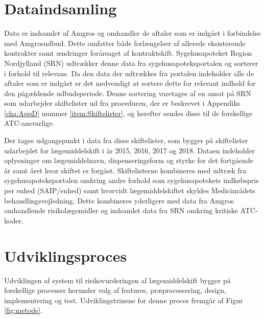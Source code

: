 \section{Dataindsamling}
Data er indsamlet af Amgros og omhandler de aftaler som er indgået i forbindelse med Amgrosudbud. Dette omfatter både forlængelser af allerede eksisterende kontrakter samt ændringer forårsaget af kontraktskift. Sygehusapoteket Region Nordjylland (SRN) udtrækker denne data fra sygehusapoteksportalen og sorterer i forhold til relevans. Da den data der udtrækkes fra portalen indeholder alle de aftaler som er indgået er det nødvendigt at sortere dette for relevant indhold for den pågældende udbudsperiode. Denne sortering varetages af en ansat på SRN som udarbejder skiftelister ud fra proceduren, der er beskrevet i Appendiks \ref{cha:AppD} nummer \ref{item:Skiftelister}, og herefter sendes disse til de forskellige ATC-ansvarlige.

Der tages udgangspunkt i data fra disse skiftelister, som bygger på skiftelister udarbejdet for lægemiddelskift i år 2015, 2016, 2017 og 2018. Dataen indeholder oplysninger om lægemiddelnavn, dispenseringsform og styrke for det fortgående år samt året hvor skiftet er forgået. 
Skiftelisterne kombineres med udtræk fra sygehusapoteksportalen omkring andre forhold som sygehusapotekets indkøbspris per enhed (SAIP/enhed) samt hvorvidt lægemiddelskiftet skyldes Medicinrådets behandlingsvejledning. Dette kombineres yderligere med data fra Amgros omhandlende risikolægemidler og indsamlet data fra SRN omkring kritiske ATC-koder.





\section{Udviklingsproces}
Udviklingen af system til risikovurderingen af lægemiddelskift bygger på forskellige processer herunder valg af features, præprocessering, design, implementering og test. Udviklingstrinene for denne proces fremgår af Figur \ref{fig:metode}.


